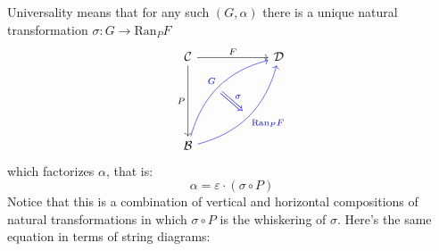 \documentclass[DaoFP]{subfiles}
\begin{document}
Universality means that for any such $(G, \alpha)$ there is a unique natural transformation $\sigma \colon G \to \text{Ran}_P F$
\[
\begin{tikzcd}[row sep=2cm, column sep=2cm]
\cat C  \ar[d, "P"', "" {name=P}]
            \ar[r, "F", ""  {name=F, below, near start, bend right}]
&
\cat D
\\
\cat B
    \ar[ur, blue, bend left, "G", "" {name=G, below}]
    \ar[ur, blue, bend right, "\text{Ran}_P F"', "" {name=Ran}]
\arrow[Rightarrow, blue, "\sigma", from=G, to=Ran]
\end{tikzcd}
\]
 which factorizes $\alpha$, that is:
\[ \alpha = \varepsilon \cdot (\sigma \circ P) \]
Notice that this is a combination of vertical and horizontal compositions of natural transformations in which $\sigma \circ P$ is the whiskering of $\sigma$. Here's the same equation in terms of string diagrams:
\end{document}
